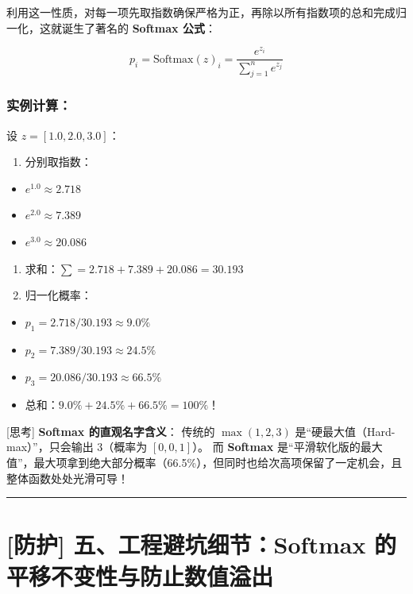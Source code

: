 利用这一性质，对每一项先取指数确保严格为正，再除以所有指数项的总和完成归一化，这就诞生了著名的 \textbf{Softmax 公式}：

\[
p_i = \text{Softmax}(z)_i = \frac{e^{z_i}}{\sum_{j=1}^n e^{z_j}}
\]

\subsubsection{实例计算：}

设 $z = [1.0, 2.0, 3.0]$：
\begin{enumerate}
  \item 分别取指数：
\end{enumerate}

\begin{itemize}
  \item $e^{1.0} \approx 2.718$
  \item $e^{2.0} \approx 7.389$
  \item $e^{3.0} \approx 20.086$
\end{itemize}

\begin{enumerate}
  \item 求和：$\sum = 2.718 + 7.389 + 20.086 = 30.193$
  \item 归一化概率：
\end{enumerate}

\begin{itemize}
  \item $p_1 = 2.718 / 30.193 \approx 9.0\%$
  \item $p_2 = 7.389 / 30.193 \approx 24.5\%$
  \item $p_3 = 20.086 / 30.193 \approx 66.5\%$
  \item 总和：$9.0\% + 24.5\% + 66.5\% = 100\%$！
\end{itemize}

\begin{tipBox}[核心直觉与思考]
{}[思考] \textbf{Softmax 的直观名字含义}：
传统的 $\max(1, 2, 3)$ 是“硬最大值（Hard-max）”，只会输出 3（概率为 $[0, 0, 1]$）。
而 \textbf{Softmax} 是“平滑软化版的最大值”，最大项拿到绝大部分概率（66.5\%），但同时也给次高项保留了一定机会，且整体函数处处光滑可导！
\end{tipBox}

\vspace{0.8em}\hrule\vspace{0.8em}

\section{[防护] 五、工程避坑细节：Softmax 的平移不变性与防止数值溢出}

